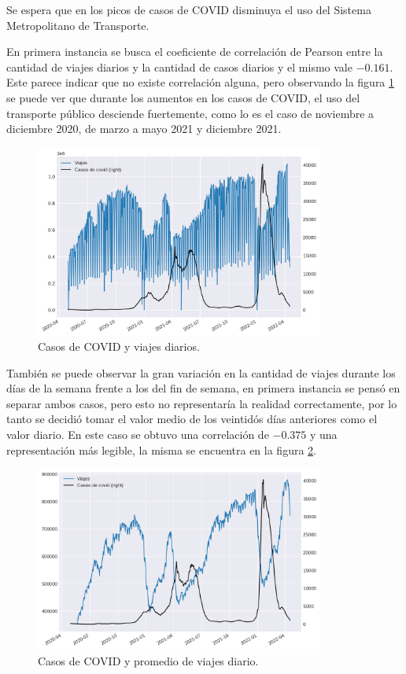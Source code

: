 \documentclass[conference]{IEEEtran}
\begin{document}
Se espera que en los picos de casos de COVID disminuya el uso del Sistema Metropolitano de Transporte.

En primera instancia se busca el coeficiente de correlación de Pearson entre la cantidad de viajes diarios y la cantidad de casos diarios y el mismo vale $-0.161$. Este parece indicar que no existe correlación alguna, pero observando la figura \ref{dtcv} se puede ver que durante los aumentos en los casos de COVID, el uso del transporte público desciende fuertemente, como lo es el caso de noviembre a diciembre 2020, de marzo a mayo 2021 y diciembre 2021. 

\begin{figure}[htbp]
\centerline{\includegraphics[width=95mm]{Pictures/dtcv.png}}
\caption{Casos de COVID y viajes diarios.}
\label{dtcv}
\end{figure}

También se puede observar la gran variación en la cantidad de viajes durante los días de la semana frente a los del fin de semana, en primera instancia se pensó en separar ambos casos, pero esto no representaría la realidad correctamente, por lo tanto se decidió tomar el valor medio de los veintidós días anteriores como el valor diario. En este caso se obtuvo una correlación de $-0.375$ y una representación más legible, la misma se encuentra en la figura \ref{drcv}.

\begin{figure}[htbp]
\centerline{\includegraphics[width=95mm]{Pictures/drcv.png}}
\caption{Casos de COVID y promedio de viajes diario.}
\label{drcv}
\end{figure}
\end{document}
